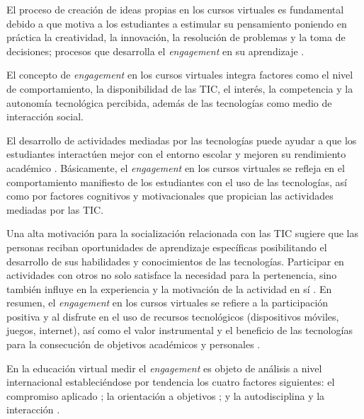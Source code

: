 \documentclass{textolivre}
\begin{document}
El proceso de creación de ideas propias en los cursos virtuales es fundamental debido a que motiva a los estudiantes a estimular su pensamiento poniendo en práctica la creatividad, la innovación, la resolución de problemas y la toma de decisiones; procesos que desarrolla el \emph{engagement} en su aprendizaje \cite{barrios2014}. %

El concepto de \emph{engagement} en los cursos virtuales integra factores como el nivel de comportamiento, la disponibilidad de las TIC, el interés, la competencia y la autonomía tecnológica percibida, además de las tecnologías como medio de interacción social.

El desarrollo de actividades mediadas por las tecnologías puede ayudar a que los estudiantes interactúen mejor con el entorno escolar y mejoren su rendimiento académico \cite{goldhammer2017}. %
Básicamente, el \emph{engagement} en los cursos virtuales se refleja en el comportamiento manifiesto de los estudiantes con el uso de las tecnologías, así como por factores cognitivos y motivacionales que propician las actividades mediadas por las TIC.

Una alta motivación para la socialización relacionada con las TIC sugiere que las personas reciban oportunidades de aprendizaje específicas posibilitando el desarrollo de sus habilidades y conocimientos de las tecnologías. Participar en actividades con otros no solo satisface la necesidad para la pertenencia, sino también influye en la experiencia y la motivación de la actividad en sí \cite{senkbeil2018}. %
En resumen, el \emph{engagement} en los cursos virtuales se refiere a la participación positiva y al disfrute en el uso de recursos tecnológicos (dispositivos móviles, juegos, internet), así como el valor instrumental y el beneficio de las tecnologías para la consecución de objetivos académicos y personales \cite{goldhammer2017}. %

En la educación virtual medir el \emph{engagement} \cite{mohd2020} %
es objeto de análisis a nivel internacional estableciéndose por tendencia los cuatro factores siguientes:  el compromiso aplicado \cite{handelsman2005, shumow2013}; %
la orientación a objetivos \cite{bakker2018, mohd2020, eltahir2021}; %
y la autodisciplina y la interacción \cite{alexander2018, kerimbayev2020, snyder2020, sim2021, walker2021, smith2021}. %
\end{document}
